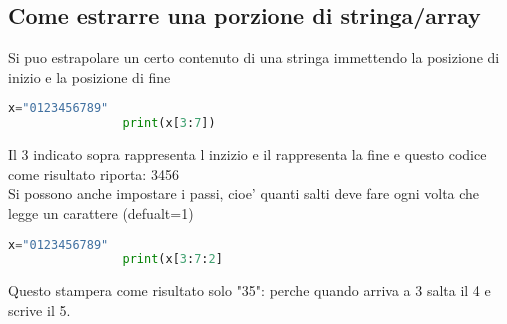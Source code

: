 \documentclass{article}
\begin{document}
\begin{flushleft}
\begin{flushleft}
        \subsection{Come estrarre una porzione di stringa/array}
        \begin{flushleft}
            Si puo estrapolare un certo contenuto di una stringa immettendo la posizione di inizio e la posizione di fine
            \begin{lstlisting}[language=Python]
                x="0123456789"
                print(x[3:7])
            \end{lstlisting}
            Il 3 indicato sopra rappresenta l inzizio e il rappresenta la fine e questo codice come risultato riporta: 3456\\
            Si possono anche impostare i passi, cioe' quanti salti deve fare ogni volta che legge un carattere (defualt=1)
            \begin{lstlisting}[language=Python]
                x="0123456789"
                print(x[3:7:2]
            \end{lstlisting}
            Questo stampera come risultato solo "35": perche quando arriva a 3 salta il 4 e scrive il 5.
        \end{flushleft}
       \end{flushleft}
    \end{flushleft}
\end{document}
